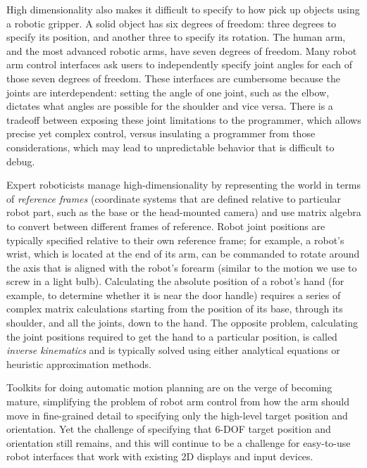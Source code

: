 \documentclass[11pt,twocolumn]{article}
\begin{document}
High dimensionality also makes it difficult to specify to how pick up objects using a robotic gripper. A solid object has six degrees of freedom: three degrees to specify its position, and another three to specify its rotation. The human arm, and the most advanced robotic arms, have seven degrees of freedom.  Many robot arm control interfaces ask users to independently specify joint angles for each of those seven degrees of freedom. These interfaces are cumbersome because the joints are interdependent: setting the angle of one joint, such as the elbow, dictates what angles are possible for the shoulder and vice versa. There is a tradeoff between exposing these joint limitations to the programmer, which allows precise yet complex control, versus insulating a programmer from those considerations, which may lead to unpredictable behavior that is difficult to debug.

Expert roboticists manage high-dimensionality by representing the world in terms of {\em reference frames} (coordinate systems that are defined relative to particular robot part, such as the base or the head-mounted camera) and use matrix algebra to convert between different frames of reference. Robot joint positions are typically specified relative to their own reference frame; for example, a robot's wrist, which is located at the end of its arm, can be commanded to rotate around the axis that is aligned with the robot's forearm (similar to the motion we use to screw in a light bulb). Calculating the absolute position of a robot's hand (for example, to determine whether it is near the door handle) requires a series of complex matrix calculations starting from the position of its base, through its shoulder, and all the joints, down to the hand. The opposite problem, calculating the joint positions required to get the hand to a particular position, is called {\em inverse kinematics} and is typically solved using either analytical equations or heuristic approximation methods.


Toolkits for doing automatic motion planning are on the verge of becoming mature, simplifying the problem of robot arm control from how the arm should move in fine-grained detail to specifying only the high-level target position and orientation. Yet the challenge of specifying that 6-DOF target position and orientation still remains, and this will continue to be a challenge for easy-to-use robot interfaces that work with existing 2D displays and input devices.
\end{document}

